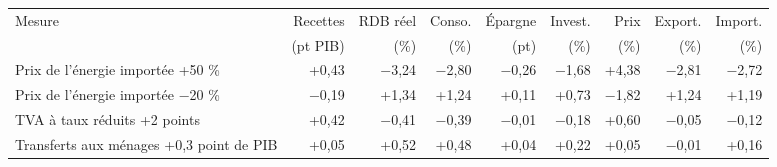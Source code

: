 \begin{tabular}{p{5.0cm}rrrrrrrr}
\toprule
Mesure & Recettes & RDB réel & Conso. & Épargne & Invest. & Prix & Export. & Import. \\
 & (pt PIB) & (\%) & (\%) & (pt) & (\%) & (\%) & (\%) & (\%) \\
\midrule
Prix de l'énergie importée +50 \% & +0{,}43 & $-$3{,}24 & $-$2{,}80 & $-$0{,}26 & $-$1{,}68 & +4{,}38 & $-$2{,}81 & $-$2{,}72 \\
Prix de l'énergie importée −20 \% & $-$0{,}19 & +1{,}34 & +1{,}24 & +0{,}11 & +0{,}73 & $-$1{,}82 & +1{,}24 & +1{,}19 \\
TVA à taux réduits +2 points & +0{,}42 & $-$0{,}41 & $-$0{,}39 & $-$0{,}01 & $-$0{,}18 & +0{,}60 & $-$0{,}05 & $-$0{,}12 \\
Transferts aux ménages +0,3 point de PIB & +0{,}05 & +0{,}52 & +0{,}48 & +0{,}04 & +0{,}22 & +0{,}05 & $-$0{,}01 & +0{,}16 \\
\bottomrule
\end{tabular}
